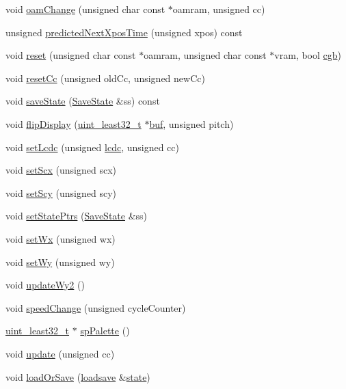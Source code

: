 \begin{DoxyCompactItemize}
\item 
void \hyperlink{classgambatte_1_1PPU_a5c1f4b8784c8303e0f3af5bbc27751a5}{oam\+Change} (unsigned char const $\ast$oamram, unsigned cc)
\item 
unsigned \hyperlink{classgambatte_1_1PPU_ad8d55b06d78e952bed556cf3e51c0b78}{predicted\+Next\+Xpos\+Time} (unsigned xpos) const
\item 
void \hyperlink{classgambatte_1_1PPU_a99cf75af19c1fca9c8464ed8f49e799d}{reset} (unsigned char const $\ast$oamram, unsigned char const $\ast$vram, bool \hyperlink{classgambatte_1_1PPU_a2753f1ba5217fe22bc0d518b63784825}{cgb})
\item 
void \hyperlink{classgambatte_1_1PPU_a43601e1b8576bcf31b9716bc2637d1cd}{reset\+Cc} (unsigned old\+Cc, unsigned new\+Cc)
\item 
void \hyperlink{classgambatte_1_1PPU_a56bea94c1f2c2caaa597145a3f95b01b}{save\+State} (\hyperlink{structgambatte_1_1SaveState}{Save\+State} \&ss) const
\item 
void \hyperlink{classgambatte_1_1PPU_a17571a5f4163a66bbc8310dca6c734aa}{flip\+Display} (\hyperlink{namespacegambatte_a0639f09fccfbbd5a8e0796318768e370}{uint\+\_\+least32\+\_\+t} $\ast$\hyperlink{ioapi_8h_a8ad8a13c88886b9f623034ff88570adb}{buf}, unsigned pitch)
\item 
void \hyperlink{classgambatte_1_1PPU_acf0e51190d5b912a91d9e9b8cbb1f8aa}{set\+Lcdc} (unsigned \hyperlink{classgambatte_1_1PPU_aaafd3c2cf72649e5b144bb2ae6d2457a}{lcdc}, unsigned cc)
\item 
void \hyperlink{classgambatte_1_1PPU_aae64d6ecf523571757b951632d783232}{set\+Scx} (unsigned scx)
\item 
void \hyperlink{classgambatte_1_1PPU_a277558e3f602884db0207063034e0c9b}{set\+Scy} (unsigned scy)
\item 
void \hyperlink{classgambatte_1_1PPU_a460be85dec82811e994a7cbb44a183e2}{set\+State\+Ptrs} (\hyperlink{structgambatte_1_1SaveState}{Save\+State} \&ss)
\item 
void \hyperlink{classgambatte_1_1PPU_a21c837eecefb1f260795c8894f7cbd0c}{set\+Wx} (unsigned wx)
\item 
void \hyperlink{classgambatte_1_1PPU_ab570e79665e77e73bab93985acd15d23}{set\+Wy} (unsigned wy)
\item 
void \hyperlink{classgambatte_1_1PPU_a33dbb53f8dc14f9a590777084f55d78c}{update\+Wy2} ()
\item 
void \hyperlink{classgambatte_1_1PPU_a8e075cf376f246914ceb768585fbfbf6}{speed\+Change} (unsigned cycle\+Counter)
\item 
\hyperlink{namespacegambatte_a0639f09fccfbbd5a8e0796318768e370}{uint\+\_\+least32\+\_\+t} $\ast$ \hyperlink{classgambatte_1_1PPU_ae6a6686a0751e14ff4f6cd794c6aada4}{sp\+Palette} ()
\item 
void \hyperlink{classgambatte_1_1PPU_a0ac64d34f6537dd249f30567d0a1b593}{update} (unsigned cc)
\item 
void \hyperlink{classgambatte_1_1PPU_a09d8a46b05a01daf4accbef11560d937}{load\+Or\+Save} (\hyperlink{classgambatte_1_1loadsave}{loadsave} \&\hyperlink{ppu_8cpp_a2f2eca6997ee7baf8901725ae074d45b}{state})
\end{DoxyCompactItemize}
